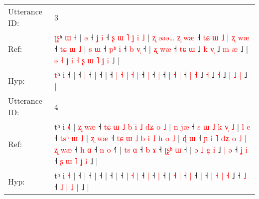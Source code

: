 \documentclass[10pt]{article}
\DeclareRobustCommand{\hl}[1]{{\textcolor{red}{#1}}}
\begin{document}
\begin{longtable}{ll}
 \\
\midrule
Utterance ID: & 3 \\
Ref: & \hl{ʈ}\hl{ʂ}ʰ \hl{ɯ} ˧ |\hl{ }\hl{ə} ˧\hl{ }\hl{ʝ} \hl{i} ˧\hl{ }\hl{ʂ}\hl{ }\hl{ɯ}\hl{ }\hl{˥}\hl{ }\hl{ʝ}\hl{ }\hl{i}\hl{ }\hl{˩} |\hl{ }\hl{ʐ}\hl{ }\hl{ə}\hl{ə}\hl{ə}\hl{…}\hl{ }\hl{ʐ}\hl{ }\hl{w}\hl{æ} ˧\hl{ }\hl{t}\hl{ɕ}\hl{ }\hl{ɯ}\hl{ }\hl{˩} |\hl{ }\hl{ʐ}\hl{ }\hl{w}\hl{æ} ˧\hl{ }\hl{t}\hl{ɕ} \hl{ɯ} \hl{˩} | \hl{s} \hl{ɯ} ˧\hl{ }\hl{p}\hl{ʰ} \hl{i} ˧\hl{ }\hl{b} \hl{v}\hl{̩} ˧ | \hl{ʐ} \hl{w}\hl{æ} ˧ \hl{t}\hl{ɕ} \hl{ɯ} ˩\hl{ }\hl{k} \hl{v}\hl{̩} ˩\hl{ }\hl{m} \hl{æ} ˩ |\hl{ }\hl{ə}\hl{ }\hl{˧}\hl{ }\hl{ʝ}\hl{ }\hl{i}\hl{ }\hl{˧}\hl{ }\hl{ʂ}\hl{ }\hl{ɯ}\hl{ }\hl{˥} \hl{ʝ} \hl{i} ˩ |
 \\
Hyp: & \hl{}\hl{t}ʰ \hl{i} ˧ |\hl{}\hl{} ˧\hl{}\hl{} \hl{|} ˧\hl{}\hl{}\hl{}\hl{}\hl{}\hl{}\hl{}\hl{}\hl{}\hl{}\hl{}\hl{} |\hl{}\hl{}\hl{}\hl{}\hl{}\hl{}\hl{}\hl{}\hl{}\hl{}\hl{}\hl{} ˧\hl{}\hl{}\hl{}\hl{}\hl{}\hl{}\hl{} |\hl{}\hl{}\hl{}\hl{}\hl{} ˧\hl{}\hl{}\hl{} \hl{|} \hl{˧} | \hl{˧} \hl{|} ˧\hl{}\hl{}\hl{} \hl{|} ˧\hl{}\hl{} \hl{}\hl{|} ˧ | \hl{˧} \hl{}\hl{|} ˧ \hl{}\hl{|} \hl{˧} ˩\hl{}\hl{} \hl{}\hl{˧} ˩\hl{}\hl{} \hl{˧} ˩ |\hl{}\hl{}\hl{}\hl{}\hl{}\hl{}\hl{}\hl{}\hl{}\hl{}\hl{}\hl{}\hl{}\hl{}\hl{}\hl{} \hl{˩} \hl{|} ˩ |
 \\
\midrule
Utterance ID: & 4 \\
Ref: & tʰ i \hl{˩}\hl{˥} |\hl{ }\hl{ʐ}\hl{ }\hl{w}\hl{æ} ˧\hl{ }\hl{t}\hl{ɕ}\hl{ }\hl{ɯ}\hl{ }\hl{˩}\hl{ }\hl{b}\hl{ }\hl{i}\hl{ }\hl{˩}\hl{ }\hl{d}\hl{ʑ}\hl{ }\hl{o}\hl{ }\hl{˩} |\hl{ }\hl{n}\hl{ }\hl{j}\hl{æ} ˧\hl{ }\hl{s}\hl{ }\hl{ɯ}\hl{ }\hl{˩}\hl{ }\hl{k}\hl{ }\hl{v}\hl{̩}\hl{ }\hl{˩} |\hl{ }\hl{l}\hl{ }\hl{e} ˧\hl{ }\hl{t}\hl{s}\hl{ʰ}\hl{ }\hl{ɯ}\hl{ }\hl{˩} |\hl{ }\hl{ʐ}\hl{ }\hl{w}\hl{æ} ˧\hl{ }\hl{t}\hl{ɕ}\hl{ }\hl{ɯ}\hl{ }\hl{˩}\hl{ }\hl{b}\hl{ }\hl{i}\hl{ }\hl{˩}\hl{ }\hl{h}\hl{ }\hl{o}\hl{ }\hl{˩} |\hl{ }\hl{ɖ}\hl{ }\hl{ɯ} ˧\hl{ }\hl{ɲ}\hl{ }\hl{i}\hl{ }\hl{˥}\hl{ }\hl{d}\hl{ʑ}\hl{ }\hl{o}\hl{ }\hl{˩} | \hl{ʐ} \hl{w}\hl{æ} ˧\hl{ }\hl{h} \hl{ɑ} ˧\hl{ }\hl{n} \hl{o} ˧\hl{˥} | \hl{t}\hl{s} \hl{ɑ} ˧\hl{ }\hl{b} \hl{ɤ} ˧\hl{ }\hl{ʈ}\hl{ʂ}\hl{ʰ} \hl{ɯ} ˧ |\hl{ }\hl{ə} \hl{˩} \hl{g} \hl{i} ˩\hl{ }\hl{|}\hl{ }\hl{ə} ˧\hl{ }\hl{ʝ} \hl{i} ˧\hl{ }\hl{ʂ} \hl{ɯ} \hl{˥} \hl{ʝ} \hl{i} ˩ |
 \\
Hyp: & tʰ i \hl{}\hl{˧} |\hl{}\hl{}\hl{}\hl{}\hl{} ˧\hl{}\hl{}\hl{}\hl{}\hl{}\hl{}\hl{}\hl{}\hl{}\hl{}\hl{}\hl{}\hl{}\hl{}\hl{}\hl{}\hl{}\hl{}\hl{}\hl{} |\hl{}\hl{}\hl{}\hl{}\hl{} ˧\hl{}\hl{}\hl{}\hl{}\hl{}\hl{}\hl{}\hl{}\hl{}\hl{}\hl{}\hl{}\hl{} |\hl{}\hl{}\hl{}\hl{} ˧\hl{}\hl{}\hl{}\hl{}\hl{}\hl{}\hl{}\hl{} |\hl{}\hl{}\hl{}\hl{}\hl{} ˧\hl{}\hl{}\hl{}\hl{}\hl{}\hl{}\hl{}\hl{}\hl{}\hl{}\hl{}\hl{}\hl{}\hl{}\hl{}\hl{}\hl{}\hl{}\hl{} |\hl{}\hl{}\hl{}\hl{} ˧\hl{}\hl{}\hl{}\hl{}\hl{}\hl{}\hl{}\hl{}\hl{}\hl{}\hl{}\hl{}\hl{} | \hl{˧} \hl{}\hl{|} ˧\hl{}\hl{} \hl{|} ˧\hl{}\hl{} \hl{|} ˧\hl{} | \hl{}\hl{˧} \hl{|} ˧\hl{}\hl{} \hl{|} ˧\hl{}\hl{}\hl{}\hl{} \hl{|} ˧ |\hl{}\hl{} \hl{˧} \hl{|} \hl{˧} ˩\hl{}\hl{}\hl{}\hl{} ˧\hl{}\hl{} \hl{˩} ˧\hl{}\hl{} \hl{˩} \hl{|} \hl{˩} \hl{|} ˩ |

\end{longtable}
\end{document}
